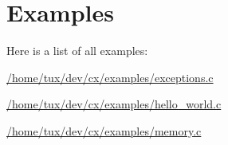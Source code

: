 \section{Examples}
Here is a list of all examples\+:\begin{DoxyCompactItemize}
\item 
\hyperlink{_2home_2tux_2dev_2cx_2examples_2exceptions_8c-example}{/home/tux/dev/cx/examples/exceptions.\+c}
\item 
\hyperlink{_2home_2tux_2dev_2cx_2examples_2hello_world_8c-example}{/home/tux/dev/cx/examples/hello\+\_\+world.\+c}
\item 
\hyperlink{_2home_2tux_2dev_2cx_2examples_2memory_8c-example}{/home/tux/dev/cx/examples/memory.\+c}
\end{DoxyCompactItemize}
